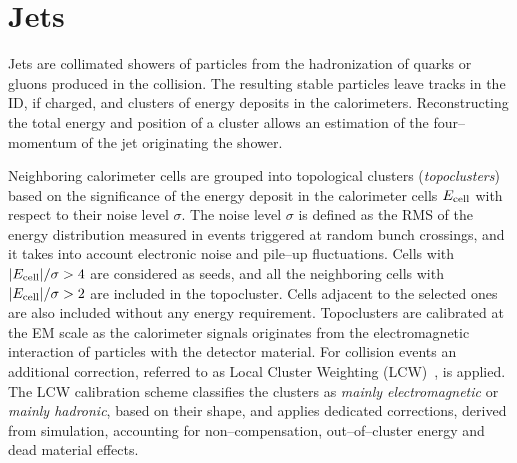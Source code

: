 \section{Jets}
\label{sec:jets}

Jets are collimated showers of particles from the hadronization of
quarks or gluons produced in the collision.
The resulting stable particles leave tracks in the ID, if charged, and
clusters of energy deposits in the calorimeters.
Reconstructing the total energy and position of a cluster allows an
estimation of the four--momentum of the jet originating the shower.

Neighboring calorimeter cells are grouped into topological clusters
({\it topoclusters}) based on the significance of the energy deposit
in the calorimeter cells $E_{\rm cell}$ with respect to their noise
level $\sigma$. The noise level $\sigma$ is defined as the RMS of the
energy distribution measured in events triggered at random bunch
crossings, and it takes into account electronic noise and pile--up
fluctuations. Cells with $|E_{\rm cell}|/\sigma>4$ are considered as
seeds, and all the neighboring cells with $|E_{\rm cell}|/\sigma > 2$
are included in the topocluster. Cells adjacent to the selected ones
are also included without any energy requirement.
Topoclusters are calibrated at the EM scale as the
calorimeter signals originates from the electromagnetic interaction of
particles with the detector material. For \eighttev{} collision events
an additional correction, referred to as Local Cluster Weighting
(LCW)~\cite{lcwcalib}, is applied. The LCW calibration
scheme classifies the clusters as {\it mainly electromagnetic} or
{\it mainly hadronic}, based on their shape, and applies
dedicated corrections, derived from simulation, accounting for
non--compensation, out--of--cluster energy and dead material effects. 

